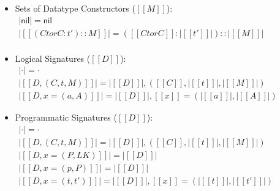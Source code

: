 \documentclass[phd,appendix,dedicationpage,ackpage,epigraphpage]{uithesis}
\begin{document}
\begin{definition}
\begin{itemize}
  \item Sets of Datatype Constructors ($[[M]]$):\\
    \begin{math}
      \begin{array}{lll}
        |\mathsf{nil}| = \mathsf{nil}\\
        |[[(Ctor C : t') :: M]]| = ([[Ctor C]] : |[[t']]|)::|[[M]]| \\
      \end{array}
    \end{math}
    
  \item Logical Signatures ($[[D]]$):\\
    \begin{math}
      \begin{array}{lll}
        |\cdot| = \cdot\\
        |[[D , ( C , t , M )]]| = |[[D]]|, ([[C]], |[[t]]|, |[[M]]|)\\
        |[[D , x = ( a , A )]]| = |[[D]]| , [[x]] = ( |[[a]]| , |[[A]]| )
      \end{array}
    \end{math}

  \item Programmatic Signatures ($[[D]]$):\\
    \begin{math}
      \begin{array}{lll}
        |\cdot| = \cdot\\
        |[[D , ( C , t , M )]]| = |[[D]]|, ([[C]], |[[t]]|, |[[M]]|)\\
        |[[D , x = ( P , LK )]]| = |[[D]]|\\
        |[[D , x = ( p , P )]]| = |[[D]]|\\
        |[[D , x = ( t , t' )]]| = |[[D]]| , [[x]] = ( |[[t]]| , |[[t']]| )
      \end{array}
    \end{math}
  \end{itemize}
\end{definition}



\end{document}
